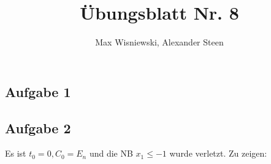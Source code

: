\documentclass[11pt,a4paper,ngerman]{article}
\date{}
\title{Übungsblatt Nr. 8}
\author{Max Wisniewski, Alexander Steen}
\begin{document}
\renewcommand{\figurename}{Figure}
\maketitle
\thispagestyle{fancy}


\subsection*{Aufgabe 1}

\subsection*{Aufgabe 2}
Es ist $t_0 = 0, C_0 = E_n$ und die NB $x_1 \leq -1$ wurde verletzt.
Zu zeigen:
\end{document}
